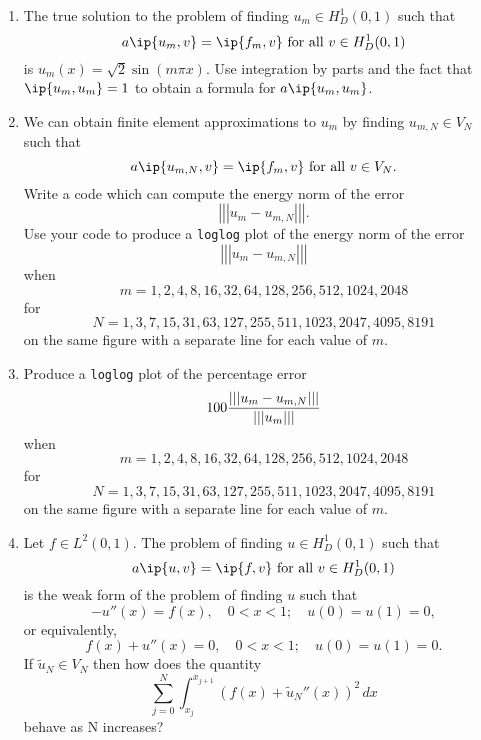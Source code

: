 \begin{enumerate}
\item The true solution to the problem of finding $u_m\in H^1_D(0,1)$ such that
\[
a\ip{u_m,v}=\ip{f_m,v}\mbox{ for all }v\in H^1_D(0,1)
\]
is $u_m(x)=\sqrt{2}\sin(m\pi x)$. Use integration by parts and the fact that $\ip{u_m,u_m}=1$ to obtain a formula for $a\ip{u_m,u_m}$.
\\
\item We can obtain finite element approximations to $u_m$ by finding $u_{m,N}\in V_N$ such that
\[
a\ip{u_{m,N},v}=\ip{f_m,v}\mbox{ for all }v\in V_N.
\]
Write a code which can compute the energy norm of the error
\[
\left|\left|\left|u_m-u_{m,N}\right|\right|\right|.
\]
Use your code to produce a \verb|loglog| plot of the energy norm of the error
\[
\left|\left|\left|u_m-u_{m,N}\right|\right|\right|
\]
when
\[
m=1,2,4,8,16,32,64,128,256,512,1024,2048
\]
for
\[
N=1,3,7,15,31,63,127,255,511,1023,2047,4095,8191
\]
on the same figure with a separate line for each value of $m$.
\\
\item Produce a \verb|loglog| plot of the percentage error
\[
100{\left|\left|\left|u_m-u_{m,N}\right|\right|\right| \over \left|\left|\left|u_m\right|\right|\right|}
\]
when
\[
m=1,2,4,8,16,32,64,128,256,512,1024,2048
\]
for
\[
N=1,3,7,15,31,63,127,255,511,1023,2047,4095,8191
\]
on the same figure with a separate line for each value of $m$.
\\
\item Let $f\in L^2(0,1)$. The problem of finding $u\in H^1_D(0,1)$ such that
\[
a\ip{u,v}=\ip{f,v}\mbox{ for all }v\in H^1_D(0,1)
\]
is the weak form of the problem of finding $u$ such that
\[
-u''(x)=f(x),\quad0<x<1;\quad u(0)=u(1)=0,
\]
or equivalently,
\[
f(x)+u''(x)=0,\quad0<x<1;\quad u(0)=u(1)=0.
\]
If $\tilde{u}_N\in V_N$ then how does the quantity
\[
\sum_{j=0}^N\int_{x_j}^{x_{j+1}}(f(x)+\tilde{u}_N''(x))^2\,dx
\]
behave as N increases?
\end{enumerate}

           


